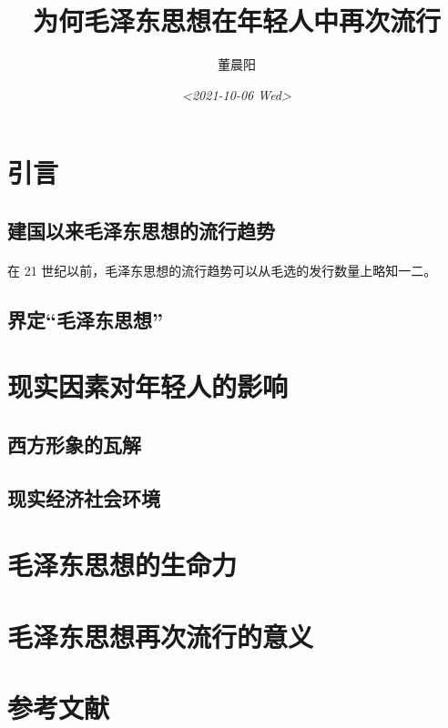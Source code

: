 \documentclass[11pt]{article}
\author{董晨阳}
\date{\textit{<2021-10-06 Wed>}}
\title{为何毛泽东思想在年轻人中再次流行}
\begin{document}
\maketitle
\tableofcontents

\section{引言}
\label{sec:org86cab2f}
\subsection{建国以来毛泽东思想的流行趋势}
\label{sec:orga3300ff}


\paragraph{}

在 21 世纪以前，毛泽东思想的流行趋势可以从毛选的发行数量上略知一二。



\subsection{界定“毛泽东思想”}
\label{sec:org6ff9481}
\section{现实因素对年轻人的影响}
\label{sec:orga01109d}
\subsection{西方形象的瓦解}
\label{sec:orgf5991e4}
\subsection{现实经济社会环境}
\label{sec:org0d9b11d}

\section{毛泽东思想的生命力}
\label{sec:org1296cfe}

\section{毛泽东思想再次流行的意义}
\label{sec:orgd6bc97a}

\section{参考文献}
\label{sec:org61a5111}
\nocite{*}
\printbibliography
\end{document}
